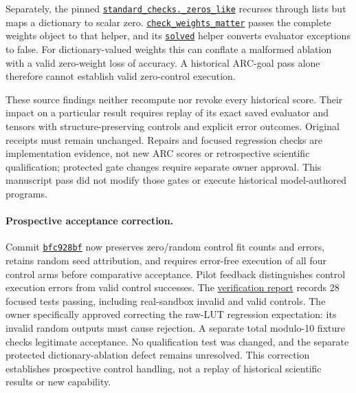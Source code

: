 \documentclass[11pt]{article}
\begin{document}
Separately, the pinned
\href{https://github.com/Sanokei/CellForge/blob/02beaf18251fca5ed1f1eb55e92f00a3e3820e88/tests/standard_checks.py#L130-L133}{\texttt{standard\_checks.\_zeros\_like}}
recurses through lists but maps a dictionary to scalar zero.
\href{https://github.com/Sanokei/CellForge/blob/02beaf18251fca5ed1f1eb55e92f00a3e3820e88/tests/arc_goal_checks.py#L134-L153}{\texttt{check\_weights\_matter}}
passes the complete weights object to that helper, and its
\href{https://github.com/Sanokei/CellForge/blob/02beaf18251fca5ed1f1eb55e92f00a3e3820e88/tests/arc_goal_checks.py#L56-L60}{\texttt{solved}}
helper converts evaluator exceptions to false. For dictionary-valued weights this can
conflate a malformed ablation with a valid zero-weight loss of accuracy. A historical
ARC-goal pass alone therefore cannot establish valid zero-control execution.

These source findings neither recompute nor revoke every historical score. Their impact
on a particular result requires replay of its exact saved evaluator and tensors with
structure-preserving controls and explicit error outcomes. Original receipts must remain
unchanged. Repairs and focused regression checks are implementation evidence, not new
ARC scores or retrospective scientific qualification; protected gate changes require
separate owner approval. This manuscript pass did not modify those gates or execute
historical model-authored programs.

\paragraph{Prospective acceptance correction.}
Commit \href{https://github.com/Sanokei/CellForge/commit/bfc928bf0c1f77922b4de00834412f986cd54bfa}{\texttt{bfc928bf}}
now preserves zero/random control fit counts and errors, retains random seed attribution,
and requires error-free execution of all four control arms before comparative acceptance.
Pilot feedback distinguishes control execution errors from valid control successes.
The \href{https://github.com/Sanokei/CellForge/blob/bfc928bf0c1f77922b4de00834412f986cd54bfa/reports/CONTROL_ERROR_INTEGRITY_20261008.md}{verification report}
records 28 focused tests passing, including real-sandbox invalid and valid controls.
The owner specifically approved correcting the raw-LUT regression expectation: its
invalid random outputs must cause rejection. A separate total modulo-10 fixture checks
legitimate acceptance. No qualification test was changed, and the separate protected
dictionary-ablation defect remains unresolved. This correction establishes prospective
control handling, not a replay of historical scientific results or new capability.
\end{document}
